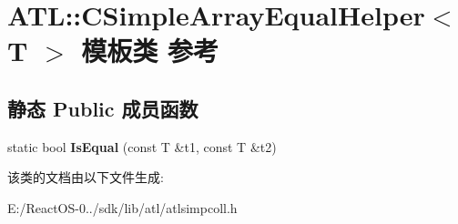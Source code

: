 \hypertarget{class_a_t_l_1_1_c_simple_array_equal_helper}{}\section{A\+TL\+:\+:C\+Simple\+Array\+Equal\+Helper$<$ T $>$ 模板类 参考}
\label{class_a_t_l_1_1_c_simple_array_equal_helper}
\subsection*{静态 Public 成员函数}
\begin{DoxyCompactItemize}
\item 
\mbox{\label{class_a_t_l_1_1_c_simple_array_equal_helper_a32bdd3e1e96ac65b8c65cb81a730d9e4}} 
static bool {\bfseries Is\+Equal} (const T \&t1, const T \&t2)
\end{DoxyCompactItemize}


该类的文档由以下文件生成\+:\begin{DoxyCompactItemize}
\item 
E\+:/\+React\+O\+S-\/0../sdk/lib/atl/atlsimpcoll.\+h\end{DoxyCompactItemize}
